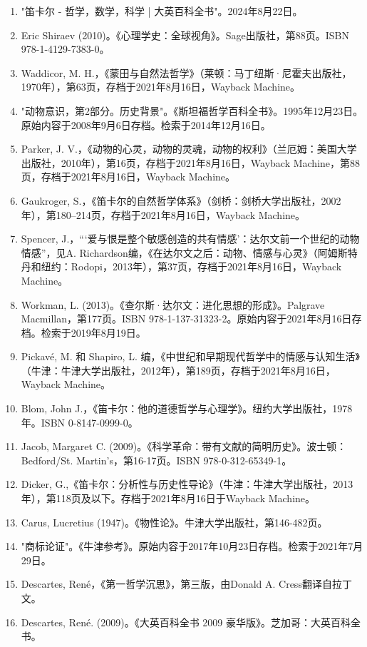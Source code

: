 \begin{enumerate}
\item "笛卡尔 - 哲学，数学，科学 | 大英百科全书"。2024年8月22日。
\item Eric Shiraev (2010)。《心理学史：全球视角》。Sage出版社，第88页。ISBN 978-1-4129-7383-0。
\item Waddicor, M. H.，《蒙田与自然法哲学》（莱顿：马丁纽斯·尼霍夫出版社，1970年），第63页，存档于2021年8月16日，Wayback Machine。
\item "动物意识，第2部分。历史背景"。《斯坦福哲学百科全书》。1995年12月23日。原始内容于2008年9月6日存档。检索于2014年12月16日。
\item Parker, J. V.，《动物的心灵，动物的灵魂，动物的权利》（兰厄姆：美国大学出版社，2010年），第16页，存档于2021年8月16日，Wayback Machine，第88页，存档于2021年8月16日，Wayback Machine。
\item Gaukroger, S.，《笛卡尔的自然哲学体系》（剑桥：剑桥大学出版社，2002年），第180–214页，存档于2021年8月16日，Wayback Machine。
\item Spencer, J.，“‘爱与恨是整个敏感创造的共有情感’：达尔文前一个世纪的动物情感”，见A. Richardson编，《在达尔文之后：动物、情感与心灵》（阿姆斯特丹和纽约：Rodopi，2013年），第37页，存档于2021年8月16日，Wayback Machine。
\item Workman, L. (2013)。《查尔斯·达尔文：进化思想的形成》。Palgrave Macmillan，第177页。ISBN 978-1-137-31323-2。原始内容于2021年8月16日存档。检索于2019年8月19日。
\item Pickavé, M. 和 Shapiro, L. 编，《中世纪和早期现代哲学中的情感与认知生活》（牛津：牛津大学出版社，2012年），第189页，存档于2021年8月16日，Wayback Machine。
\item Blom, John J.，《笛卡尔：他的道德哲学与心理学》。纽约大学出版社，1978年。ISBN 0-8147-0999-0。
\item Jacob, Margaret C. (2009)。《科学革命：带有文献的简明历史》。波士顿：Bedford/St. Martin's，第16-17页。ISBN 978-0-312-65349-1。
\item Dicker, G.,《笛卡尔：分析性与历史性导论》（牛津：牛津大学出版社，2013年），第118页及以下。存档于2021年8月16日于Wayback Machine。
\item Carus, Lucretius (1947)。《物性论》。牛津大学出版社，第146-482页。
\item "商标论证"。《牛津参考》。原始内容于2017年10月23日存档。检索于2021年7月29日。
\item Descartes, René，《第一哲学沉思》，第三版，由Donald A. Cress翻译自拉丁文。
\item Descartes, René. (2009)。《大英百科全书 2009 豪华版》。芝加哥：大英百科全书。

\end{enumerate}
